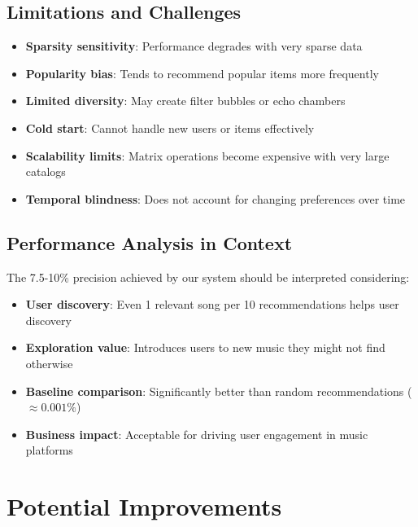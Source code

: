 \documentclass[12pt,a4paper]{article}
\begin{document}
\subsection{Limitations and Challenges}

\begin{itemize}
    \item \textbf{Sparsity sensitivity}: Performance degrades with very sparse data
    \item \textbf{Popularity bias}: Tends to recommend popular items more frequently
    \item \textbf{Limited diversity}: May create filter bubbles or echo chambers
    \item \textbf{Cold start}: Cannot handle new users or items effectively
    \item \textbf{Scalability limits}: Matrix operations become expensive with very large catalogs
    \item \textbf{Temporal blindness}: Does not account for changing preferences over time
\end{itemize}

\subsection{Performance Analysis in Context}

The 7.5-10\% precision achieved by our system should be interpreted considering:

\begin{itemize}
    \item \textbf{User discovery}: Even 1 relevant song per 10 recommendations helps user discovery
    \item \textbf{Exploration value}: Introduces users to new music they might not find otherwise
    \item \textbf{Baseline comparison}: Significantly better than random recommendations ($\approx 0.001\%$)
    \item \textbf{Business impact}: Acceptable for driving user engagement in music platforms
\end{itemize}

\section{Potential Improvements}
\end{document}
